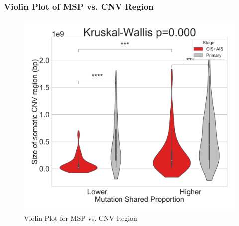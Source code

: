 \documentclass{beamer}
\begin{document}
    \begin{frame}
        \frametitle{Violin Plot of MSP vs. CNV Region}

        \begin{figure}
            \includegraphics[width=0.4 \linewidth]{figures/MutationSharedProportion_CNV/Region/Region.BWA.Sequenza.SQC.median/Violin_Mutation Shared Proportion.pdf}
            \caption{Violin Plot for MSP vs. CNV Region}
        \end{figure}
    \end{frame}
\end{document}
